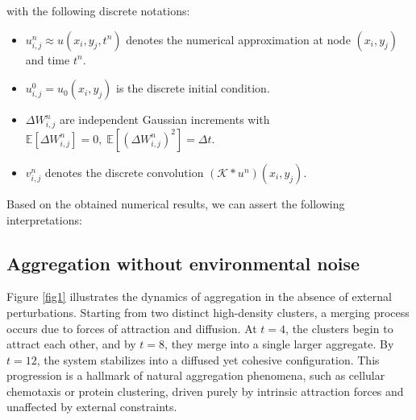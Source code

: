 \documentclass[10pt,number,preprint,times]{elsarticle}
\numberwithin{equation}{section} %
\begin{document}
with the following discrete notations:
\begin{itemize}
	\item[$\bullet$] \(u_{i,j}^n \approx u(x_i,y_j,t^n)\) denotes the numerical approximation at node \((x_i,y_j)\) and time \(t^n\).
	\item[$\bullet$] \(u_{i,j}^0 = u_0(x_i,y_j)\) is the discrete initial condition.
	\item[$\bullet$] \(\Delta W_{i,j}^n\) are independent Gaussian increments with
	\(\mathbb{E}[\Delta W_{i,j}^n]=0,\; \mathbb{E}[(\Delta W_{i,j}^n)^2]=\Delta t.\)
	\item[$\bullet$] \(v_{i,j}^n\) denotes the discrete convolution \((\mathcal{K}*u^n)(x_i,y_j)\).
\end{itemize}

\noindent



\noindent
 Based on the obtained numerical results, we can assert the following interpretations:
\subsection{Aggregation without environmental noise}
Figure \ref{fig1} illustrates the dynamics of aggregation in the absence of external perturbations. Starting from two distinct high-density clusters, a merging process occurs due to forces of attraction and diffusion. At $t=4$, the clusters begin to attract each other, and by $t=8$, they merge into a single larger aggregate. By $t=12$, the system stabilizes into a diffused yet cohesive configuration. This progression is a hallmark of natural aggregation phenomena, such as cellular chemotaxis or protein clustering, driven purely by intrinsic attraction forces and unaffected by external constraints.
\end{document}
